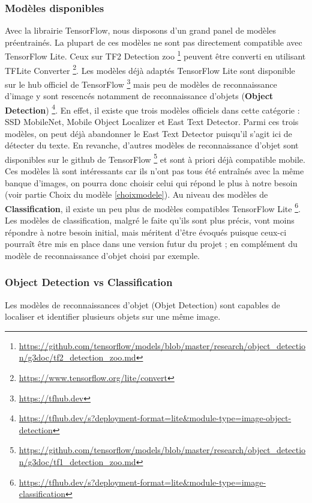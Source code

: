 \documentclass[UTF8]{EPURapport}
\begin{document}
\subsubsection{Modèles disponibles}
Avec la librairie TensorFlow, nous disposons d'un grand panel de modèles préentrainés. La plupart de ces modèles ne sont pas directement compatible avec TensorFlow Lite. Ceux sur TF2 Detection zoo \footnote{\url{https://github.com/tensorflow/models/blob/master/research/object_detection/g3doc/tf2_detection_zoo.md}} peuvent être converti en utilisant TFLite Converter \footnote{\url{https://www.tensorflow.org/lite/convert}}. Les modèles déjà adaptés TensorFlow Lite sont disponible sur le hub officiel de TensorFlow \footnote{\url{https://tfhub.dev}} mais peu de modèles de reconnaissance d'image y sont rescencés notamment de reconnaissance d'objets (\textbf{Object Detection}) \footnote{\url{https://tfhub.dev/s?deployment-format=lite&module-type=image-object-detection}}. En effet, il existe que trois modèles officiels dans cette catégorie : SSD MobileNet, Mobile Object Localizer et East Text Detector. Parmi ces trois modèles, on peut déjà abandonner le East Text Detector puisqu'il s'agit ici de détecter du texte. En revanche, d'autres modèles de reconnaissance d'objet sont disponibles sur le github de TensorFlow \footnote{\url{https://github.com/tensorflow/models/blob/master/research/object_detection/g3doc/tf1_detection_zoo.md}} et sont à priori déjà compatible mobile. Ces modèles là sont intéressants car ils n'ont pas tous été entraînés avec la même banque d'images, on pourra donc choisir celui qui répond le plus à notre besoin (voir partie Choix du modèle \ref{choixmodele}). Au niveau des modèles de \textbf{Classification}, il existe un peu plus de modèles compatibles TensorFlow Lite \footnote{\url{https://tfhub.dev/s?deployment-format=lite&module-type=image-classification}}. Les modèles de classification, malgré le faite qu'ils sont plus précis, vont moins répondre à notre besoin initial, mais méritent d'être évoqués puisque ceux-ci pourraît être mis en place dans une version futur du projet ; en complément du modèle de reconnaissance d'objet choisi par exemple.

\subsubsection{Object Detection vs Classification}
Les modèles de reconnaissances d'objet (Objet Detection) sont capables de localiser et identifier plusieurs objets sur une même image.
\end{document}
